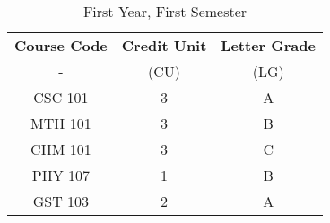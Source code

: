 \documentclass{article}
\begin{document}
\begin{table}[h!]
	\begin{center}
		\caption{First Year, First Semester}
		\label{tab:table1}
		\begin{tabular}{c|c|c|}
		  \textbf{Course Code} & \textbf{Credit Unit} & \textbf{Letter Grade}\\ 
		  - & (CU) & (LG) \\
			\hline
			CSC 101 & 3 & A\\
			MTH 101 & 3 & B\\
			CHM 101 & 3 & C\\
			PHY 107 & 1 & B\\
			GST 103 & 2 & A\\
		\end{tabular}
	\end{center}
\end{table}
\end{document}
